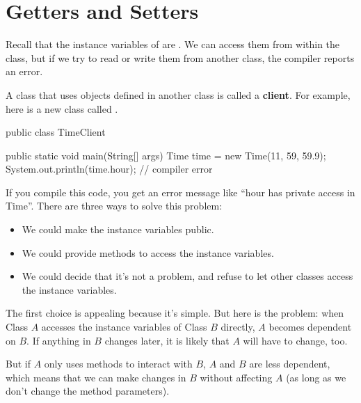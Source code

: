 \section{Getters and Setters}

Recall that the instance variables of  are .
We can access them from within the  class, but if we try to read or write them from another class, the compiler reports an error.


A class that uses objects defined in another class is called a {\bf client}.
For example, here is a new class called .


\begin{code}
public class TimeClient {

    public static void main(String[] args) {
        Time time = new Time(11, 59, 59.9);
        System.out.println(time.hour);      // compiler error
    }
}
\end{code}

If you compile this code, you get an error message like ``hour has private access in Time''.
There are three ways to solve this problem:

\begin{itemize}

\item We could make the instance variables public.

\item We could provide methods to access the instance variables.

\item We could decide that it's not a problem, and refuse to let other classes access the instance variables.

\end{itemize}

The first choice is appealing because it's simple.
But here is the problem: when Class $A$ accesses the instance variables of Class $B$ directly, $A$ becomes dependent on $B$.
If anything in $B$ changes later, it is likely that $A$ will have to change, too.


But if $A$ only uses methods to interact with $B$, $A$ and $B$ are less dependent, which means that we can make changes in $B$ without affecting $A$ (as long as we don't change the method parameters).


